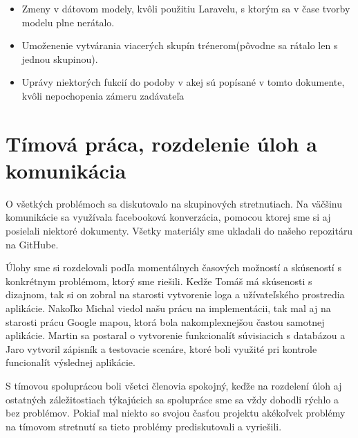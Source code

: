 \documentclass[12pt,a4paper]{report}
\theoremstyle{definition}
\theoremstyle{remark}
\begin{document}
\begin{itemize}
\item Zmeny v dátovom modely, kvôli použitiu Laravelu, s ktorým sa v čase tvorby modelu plne nerátalo.
\item Umoženenie vytvárania viacerých skupín trénerom(pôvodne sa rátalo len s jednou skupinou).
\item Uprávy niektorých fukcií do podoby v akej sú popísané v tomto dokumente, kvôli nepochopenia zámeru zadávateľa
\end{itemize}

\section{Tímová práca, rozdelenie úloh a komunikácia}
O všetkých problémoch sa diskutovalo na skupinových stretnutiach. Na väčšinu komunikácie sa využívala facebooková konverzácia, pomocou ktorej sme si aj posielali niektoré dokumenty.
Všetky materiály sme ukladali do našeho repozitáru na GitHube.

Úlohy sme si rozdelovali podľa momentálnych časových možností a skúseností s konkrétnym problémom, ktorý sme riešili. Kedže Tomáš má skúsenosti s dizajnom, tak si on zobral na starosti vytvorenie loga a užívateľského prostredia aplikácie. Nakoľko Michal viedol našu prácu na implementácii, tak mal aj na starosti prácu Google mapou, ktorá bola nakomplexnejšou častou samotnej aplikácie. Martin sa postaral o vytvorenie funkcionalít súvisiacich s databázou a Jaro vytvoril zápisník a testovacie scenáre, ktoré boli využité pri kontrole funcionalít výslednej aplikácie.

S tímovou spoluprácou boli všetci členovia spokojný, keďže na rozdelení úloh aj ostatných
záležitostiach týkajúcich sa spolupráce sme sa vždy dohodli rýchlo a bez problémov. Pokiaľ
mal niekto so svojou časťou projektu akékoľvek problémy na tímovom stretnutí sa tieto
problémy prediskutovali a vyriešili. 
\end{document}
